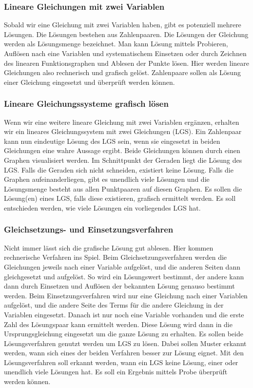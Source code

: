 \documentclass{article}
\begin{document}
\subsubsection*{Lineare Gleichungen mit zwei Variablen}
Sobald wir eine Gleichung mit zwei Variablen haben, gibt es potenziell mehrere Lösungen.
Die Lösungen bestehen aus Zahlenpaaren. Die Lösungen der Gleichung werden als Lösungsmenge bezeichnet.
Man kann Lösung mittels Probieren, Auflösen nach eine Variablen und systematischem Einsetzen oder durch Zeichnen des linearen Funktionsgraphen und Ablesen der Punkte lösen.
Hier werden lineare Gleichungen also rechnerisch und grafisch gelöst. Zahlenpaare sollen als Lösung einer Gleichung eingesetzt und überprüft werden können.
\subsubsection*{Lineare Gleichungssysteme grafisch lösen}
Wenn wir eine weitere lineare Gleichung mit zwei Variablen ergänzen, erhalten wir ein lineares Gleichungssystem mit zwei Gleichungen (LGS). Ein Zahlenpaar kann nun eindeutige Lösung des LGS sein, wenn sie eingesetzt in beiden Gleichungen eine wahre Aussage ergibt.
Beide Gleichungen können durch einen Graphen visualisiert werden. Im Schnittpunkt der Geraden liegt die Lösung des LGS. Falls die Geraden sich nicht schneiden, existiert keine Lösung.
Falls die Graphen aufeinanderliegen, gibt es unendlich viele Lösungen und die Lösungsmenge besteht aus allen Punktpaaren auf diesen Graphen.
Es sollen die Lösung(en) eines LGS, falls diese existieren, grafisch ermittelt werden. Es soll entschieden werden, wie viele Lösungen ein vorliegendes LGS hat.
\subsubsection*{Gleichsetzungs- und Einsetzungsverfahren}
Nicht immer lässt sich die grafische Lösung gut ablesen. Hier kommen rechnerische Verfahren ins Spiel.
Beim Gleichsetzungsverfahren werden die Gleichungen jeweils nach einer Variable aufgelöst, und die anderen Seiten dann gleichgesetzt und aufgelöst. So wird ein Lösungswert bestimmt, der andere kann dann durch Einsetzen und Auflösen der bekannten Lösung genauso bestimmt werden.
Beim Einsetzungsverfahren wird nur eine Gleichung nach einer Variablen aufgelöst, und die andere Seite des Terms für die andere Gleichung in der Variablen eingesetzt.
Danach ist nur noch eine Variable vorhanden und die erste Zahl des Lösungspaar kann ermittelt werden. Diese Lösung wird dann in die Ursprungsgleichung eingesetzt um die ganze Lösung zu erhalten.
Es sollen beide Lösungsverfahren genutzt werden um LGS zu lösen. Dabei sollen Muster erkannt werden, wann sich eines der beiden Verfahren besser zur Lösung eignet.
Mit den Lösungsverfahren soll erkannt werden, wann ein LGS keine Lösung, einer oder unendlich viele Lösungen hat. Es soll ein Ergebnis mittels Probe überprüft werden können.
\end{document}
